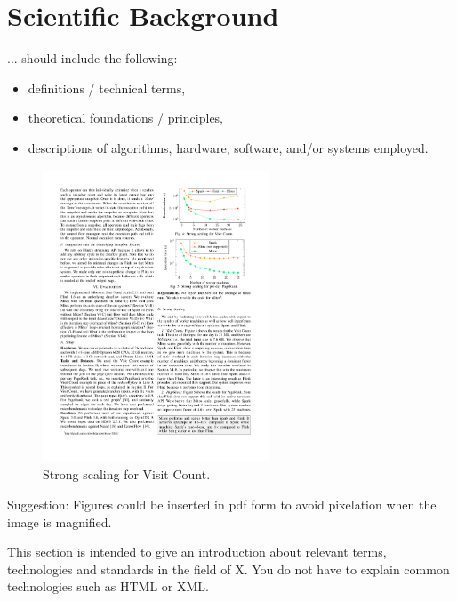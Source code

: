 \chapter{Scientific Background\label{cha:chapter2}}
... should include the following:
\begin{itemize}
    \item definitions / technical terms,
    \item theoretical foundations / principles,
    \item descriptions of algorithms, hardware, software, and/or systems employed.
\end{itemize}



\begin{figure}[h]
\centering
\includegraphics[width=0.6\textwidth]{./img/strong_scaling.pdf}
\caption{Strong scaling for Visit Count\cite{GevayRBMQM21}.}
\end{figure}

Suggestion: Figures could be inserted in pdf form to avoid pixelation when the image is magnified.

This section is intended to give an introduction about relevant terms, technologies and standards in the field of X. You do not have to explain common technologies such as HTML or XML. 


